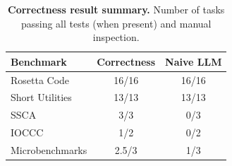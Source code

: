 \documentclass[nonacm,sigplan]{acmart}
\begin{document}
\begin{table}[htpb]
  \centering
  \caption{\textbf{Correctness result summary.} Number of tasks passing all tests (when present) and manual inspection.}
  \begin{tabular}{lcc}
    \toprule
    Benchmark & Correctness & Naive LLM \\
    \midrule
    Rosetta Code & 16/16 & 16/16  \\
    Short Utilities & 13/13 & 13/13 \\
    SSCA & 3/3 & 0/3 \\
    IOCCC & 1/2 & 0/2 \\
    Microbenchmarks & 2.5/3 & 1/3 \\
    \bottomrule
  \end{tabular}
\end{table}
\end{document}
